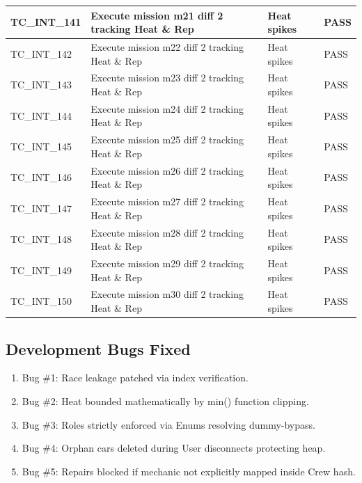 \documentclass{article}
\begin{document}
\begin{longtable}{|p{2cm}|p{8cm}|p{3cm}|p{2cm}|}
\hline
TC\_INT\_141 & Execute mission m21 diff 2 tracking Heat \& Rep & Heat spikes & PASS \\
\hline
TC\_INT\_142 & Execute mission m22 diff 2 tracking Heat \& Rep & Heat spikes & PASS \\
\hline
TC\_INT\_143 & Execute mission m23 diff 2 tracking Heat \& Rep & Heat spikes & PASS \\
\hline
TC\_INT\_144 & Execute mission m24 diff 2 tracking Heat \& Rep & Heat spikes & PASS \\
\hline
TC\_INT\_145 & Execute mission m25 diff 2 tracking Heat \& Rep & Heat spikes & PASS \\
\hline
TC\_INT\_146 & Execute mission m26 diff 2 tracking Heat \& Rep & Heat spikes & PASS \\
\hline
TC\_INT\_147 & Execute mission m27 diff 2 tracking Heat \& Rep & Heat spikes & PASS \\
\hline
TC\_INT\_148 & Execute mission m28 diff 2 tracking Heat \& Rep & Heat spikes & PASS \\
\hline
TC\_INT\_149 & Execute mission m29 diff 2 tracking Heat \& Rep & Heat spikes & PASS \\
\hline
TC\_INT\_150 & Execute mission m30 diff 2 tracking Heat \& Rep & Heat spikes & PASS \\
\hline
\end{longtable}

\subsection*{Development Bugs Fixed}
\begin{enumerate}
\item Bug \#1: Race leakage patched via index verification.
\item Bug \#2: Heat bounded mathematically by min() function clipping.
\item Bug \#3: Roles strictly enforced via Enums resolving dummy-bypass.
\item Bug \#4: Orphan cars deleted during User disconnects protecting heap.
\item Bug \#5: Repairs blocked if mechanic not explicitly mapped inside Crew hash.
\end{enumerate}
\end{document}
